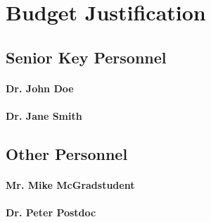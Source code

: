 
\section{Budget Justification}
\subsection{Senior Key Personnel}
\paragraph{Dr. John Doe} \lipsum[1-1]
\paragraph{Dr. Jane Smith} \lipsum[2-2]

\subsection{Other Personnel}
\paragraph{Mr. Mike McGradstudent} \lipsum[3-3]
\paragraph{Dr. Peter Postdoc} \lipsum[4-4]